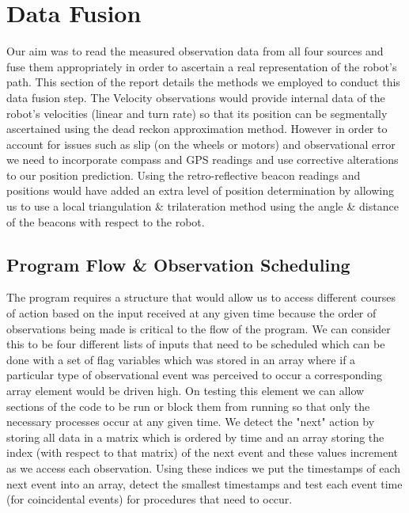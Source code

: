\newpage
\section{Data Fusion}
	Our aim was to read the measured observation data from all four sources and fuse them appropriately in order to ascertain a real representation of the robot's path. This section of the report details the methods we employed to conduct this data fusion step. The Velocity observations would provide internal data of the robot's velocities (linear and turn rate) so that its position can be segmentally ascertained using the dead reckon approximation method. However in order to account for issues such as slip (on the wheels or motors) and observational error we need to incorporate compass and GPS readings and use corrective alterations to our position prediction. Using the retro-reflective beacon readings and positions would have added an extra level of position determination by allowing us to use a local triangulation \& trilateration method using the angle \& distance of the beacons with respect to the robot.
	\subsection{Program Flow \& Observation Scheduling}
		The program requires a structure that would allow us to access different courses of action based on the input received at any given time because the order of observations being made is critical to the flow of the program. We can consider this to be four different lists of inputs that need to be scheduled which can be done with a set of flag variables which was stored in an array where if a particular type of observational event was perceived to occur a corresponding array element would be driven high. On testing this element we can allow sections of the code to be run or block them from running so that only the necessary processes occur at any given time. 
		We detect the "next" action by storing all data in a matrix which is ordered by time and an array storing the index (with respect to that matrix) of the next event and these values increment as we access each observation. Using these indices we put the timestamps of each next event into an array, detect the smallest timestamps and test each event time (for coincidental events) for procedures that need to occur.\\
		
